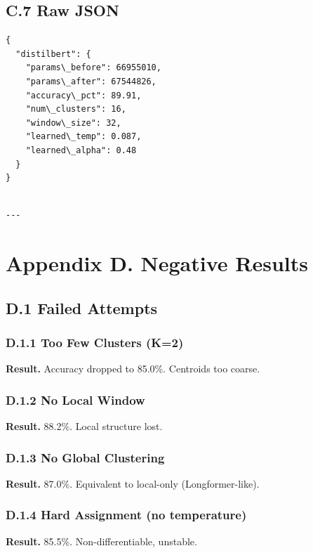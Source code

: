 \subsection{C.7 Raw JSON}

\begin{lstlisting}
{
  "distilbert": {
    "params\_before": 66955010,
    "params\_after": 67544826,
    "accuracy\_pct": 89.91,
    "num\_clusters": 16,
    "window\_size": 32,
    "learned\_temp": 0.087,
    "learned\_alpha": 0.48
  }
}
\end{lstlisting}
\begin{lstlisting}

---
\end{lstlisting}

\section{Appendix D. Negative Results}

\subsection{D.1 Failed Attempts}

\subsubsection{D.1.1 Too Few Clusters (K=2)}

\textbf{Result.} Accuracy dropped to 85.0\%. Centroids too coarse.

\subsubsection{D.1.2 No Local Window}

\textbf{Result.} 88.2\%. Local structure lost.

\subsubsection{D.1.3 No Global Clustering}

\textbf{Result.} 87.0\%. Equivalent to local-only (Longformer-like).

\subsubsection{D.1.4 Hard Assignment (no temperature)}

\textbf{Result.} 85.5\%. Non-differentiable, unstable.

